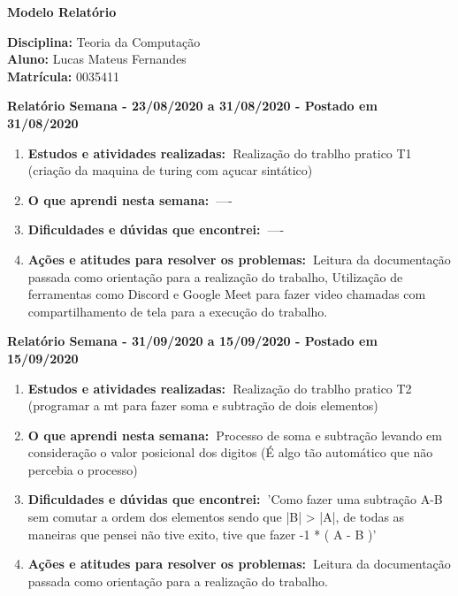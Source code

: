 \documentclass[10pt,a4paper]{report}
\newcommand{\bola}{\resizebox{12pt}{!}{$\bullet$\ }}
\newcommand{\relatorio}[3]{\vspace{3mm}\noindent\bola\textbf{Relatório Semana - #1 a #2 - Postado em #3}}
\newcommand{\atividades}{\textbf{Estudos e atividades realizadas:\ }}
\newcommand{\aprendizado}{\textbf{O que aprendi nesta semana:\ }}
\newcommand{\duvidas}{\textbf{Dificuldades e dúvidas que encontrei:\ }}
\newcommand{\acoes}{\textbf{Ações e atitudes para resolver os problemas:\ }}
\begin{document}
\begin{center} \LARGE
   \textbf{Modelo Relatório} \\[10mm]
\end{center}

\bgroup \large 
\noindent
\textbf{Disciplina:} Teoria da Computação \\
\textbf{Aluno:} Lucas Mateus Fernandes\\
\textbf{Matrícula:} 0035411\\[5mm]
\egroup

\relatorio{23/08/2020}{31/08/2020}{31/08/2020}
\begin{enumerate}
	\item \atividades Realização do trablho pratico T1 (criação da maquina de turing com açucar sintático)
	
	\item \aprendizado ----
	
	\item \duvidas ----
	
	\item \acoes Leitura da documentação passada como orientação para a realização do trabalho, Utilização de ferramentas como Discord e Google Meet para fazer video chamadas com compartilhamento de tela para a execução do trabalho.
\end{enumerate}


\relatorio{31/09/2020}{15/09/2020}{15/09/2020}
\begin{enumerate}
	\item \atividades Realização do trablho pratico T2 (programar a mt para fazer soma e subtração de dois elementos)
	
	\item \aprendizado Processo de soma e subtração levando em consideração o valor posicional dos digitos (É algo tão automático que não percebia o processo)
	
	\item \duvidas 'Como fazer uma subtração A-B sem comutar a ordem dos elementos sendo que |B| > |A|, de todas as maneiras que pensei não tive exito, tive que fazer -1 * ( A - B )'
	
	\item \acoes Leitura da documentação passada como orientação para a realização do trabalho.
\end{enumerate}
\end{document}
